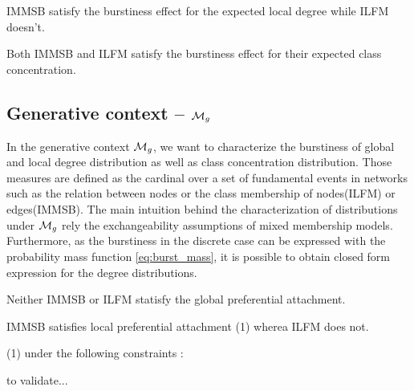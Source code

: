 \begin{proposition}\label{th:ldegree_exp_me}
    IMMSB satisfy the burstiness effect for the expected local degree while ILFM doesn't.
\end{proposition}




\begin{proposition}\label{th:feature_exp_me}
    Both IMMSB and ILFM satisfy the burstiness effect for their expected class concentration.
\end{proposition}











\subsection{Generative context -- $\mathcal{M}_g$}

In the generative context $\mathcal{M}_g$, we want to characterize the burstiness of global and local degree distribution as well as class concentration distribution. Those measures are defined as the cardinal over a set of fundamental events in networks such as the relation between nodes or the class membership of nodes(ILFM) or edges(IMMSB). The main intuition behind the characterization of distributions under $\mathcal{M}_g$ rely the exchangeability assumptions of mixed membership models. Furthermore, as the burstiness in the discrete case can be expressed with the probability mass function \ref{eq:burst_mass}, it is possible to obtain closed form expression for the degree distributions.~\\


\begin{proposition}\label{th:gdegree_mg}
    Neither IMMSB or ILFM statisfy the global preferential attachment.
\end{proposition}

\begin{proposition}\label{th:ldegree_mg}
    IMMSB satisfies local preferential attachment (1) wherea ILFM does not.

    (1) under the following constraints :

    to validate...
    
\end{proposition}

